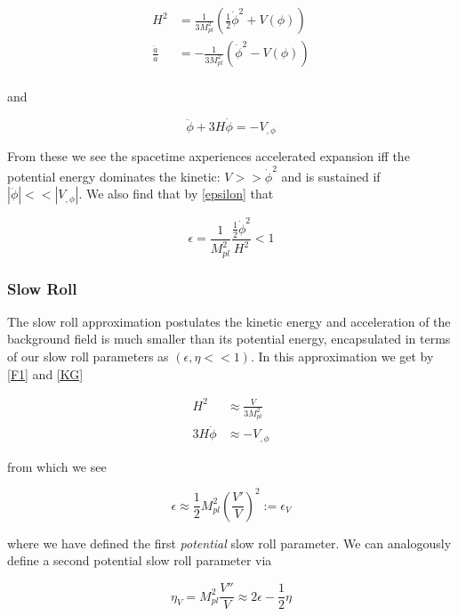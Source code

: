\documentclass[a4paper,10pt]{article}
\newcommand{\Mp}{M_{pl}}
\newcommand{\half}{\frac{1}{2}}
\begin{document}
\begin{equation}\begin{split}
H^2 &= \frac{1}{3\Mp^2}(\half\dot{\phi}^2+V(\phi))\\
\frac{\ddot{a}}{a} &= -\frac{1}{3\Mp^2}(\dot{\phi}^2-V(\phi))\\
\end{split}\end{equation}

and

\begin{equation}
\tag{KG}
\label{KG}
\ddot{\phi}+3H\dot{\phi}=-V_{,\phi}
\end{equation}

From these we see the spacetime axperiences accelerated expansion iff the potential energy dominates the kinetic: $V >> \dot{\phi}^2$ and is sustained if $|\ddot{\phi}| << |V_{,\phi}|$. We also find that by \ref{epsilon} that 

\begin{equation}
\epsilon = \frac{1}{\Mp^2}\frac{\half\dot{\phi}^2}{H^2} < 1
\end{equation}

\subsubsection{Slow Roll}

The slow roll approximation postulates the kinetic energy and acceleration of the background field is much smaller than its potential energy, encapsulated in terms of our slow roll parameters as $(\epsilon, \eta << 1)$. In this approximation we get by \ref{F1} and \ref{KG} 

\begin{equation}\begin{split}
H^2 &\approx \frac{V}{3\Mp^2} \\
3H\dot{\phi} &\approx -V_{,\phi}
\end{split}\end{equation}

from which we see 

\begin{equation}
\epsilon \approx \half\Mp^2 (\frac{V'}{V})^2 := \epsilon_V
\end{equation}

where we have defined the first \textit{potential} slow roll parameter. We can analogously define a second potential slow roll parameter via

\begin{equation}
\eta_V = \Mp^2 \frac{V''}{V} \approx 2\epsilon - \half\eta
\end{equation}
\end{document}
